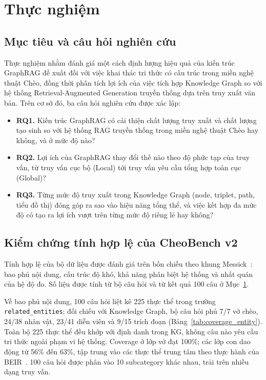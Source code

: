 \section{Thực nghiệm}
\label{sec:experiments}

\subsection{Mục tiêu và câu hỏi nghiên cứu}

Thực nghiệm nhằm đánh giá một cách định lượng hiệu quả của kiến trúc GraphRAG đề xuất đối với việc khai thác tri thức có cấu trúc trong miền nghệ thuật Chèo, đồng thời phân tích lợi ích của việc tích hợp Knowledge Graph so với hệ thống Retrieval-Augmented Generation truyền thống dựa trên truy xuất văn bản. Trên cơ sở đó, ba câu hỏi nghiên cứu được xác lập:

\begin{itemize}
  \item \textbf{RQ1.} Kiến trúc GraphRAG có cải thiện chất lượng truy xuất và chất lượng tạo sinh so với hệ thống RAG truyền thống trong miền nghệ thuật Chèo hay không, và ở mức độ nào?
  \item \textbf{RQ2.} Lợi ích của GraphRAG thay đổi thế nào theo độ phức tạp của truy vấn, từ truy vấn cục bộ (Local) tới truy vấn yêu cầu tổng hợp toàn cục (Global)?
  \item \textbf{RQ3.} Từng mức độ truy xuất trong Knowledge Graph (node, triplet, path, tiểu đồ thị) đóng góp ra sao vào hiệu năng tổng thể, và việc kết hợp đa mức độ có tạo ra lợi ích vượt trên từng mức độ riêng lẻ hay không?
\end{itemize}

\subsection{Kiểm chứng tính hợp lệ của CheoBench v2}
\label{sec:benchmark_validity}

Tính hợp lệ của bộ dữ liệu được đánh giá trên bốn chiều theo khung Messick~\cite{messick1995validity}: bao phủ nội dung, cấu trúc độ khó, khả năng phân biệt hệ thống và nhất quán của hệ độ đo. Số liệu được tính từ bộ câu hỏi và từ kết quả 100 câu ở Mục~\ref{sec:experiments}.

Về bao phủ nội dung, 100 câu hỏi liệt kê 225 thực thể trong trường \texttt{related\_entities}; đối chiếu với Knowledge Graph, bộ câu hỏi phủ 7/7 vở chèo, 24/38 nhân vật, 23/41 diễn viên và 9/15 trích đoạn (Bảng~\ref{tab:coverage_entity}). Toàn bộ 225 thực thể đều khớp với định danh trong KG, không câu nào yêu cầu tri thức ngoài phạm vi hệ thống. Coverage ở lớp vở đạt 100\%; các lớp con dao động từ 56\% đến 63\%, tập trung vào các thực thể trung tâm theo thực hành của BEIR~\cite{thakur2021beir}. 100 câu hỏi được phân vào 10 subcategory khác nhau, trải trên nhiều dạng truy vấn.

